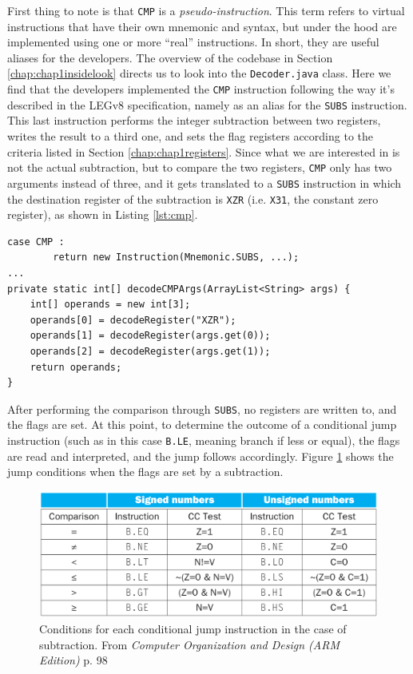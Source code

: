 First thing to note is that \verb|CMP| is a \emph{pseudo-instruction}. This term refers to virtual instructions that have their own mnemonic and syntax, but under the hood are implemented using one or more ``real'' instructions. In short, they are useful aliases for the developers. The overview of the codebase in Section \ref{chap:chap1insidelook} directs us to look into the \verb|Decoder.java| class. Here we find that the developers implemented the \verb|CMP| instruction following the way it's described in the LEGv8 specification, namely as an alias for the \verb|SUBS| instruction. 
This last instruction performs the integer subtraction between two registers, writes the result to a third one, and sets the flag registers according to the criteria listed in Section \ref{chap:chap1registers}. Since what we are interested in is not the actual subtraction, but to compare the two registers, \verb|CMP| only has two arguments instead of three, and it gets translated to a \verb|SUBS| instruction in which the destination register of the subtraction is \verb|XZR| (i.e. \verb|X31|, the constant zero register), as shown in Listing \ref{lst:cmp}. 
\begin{lstlisting}[float, caption={The CMP mnemonic being translated into a SUBS instruction}, label={lst:cmp}]
case CMP :
		return new Instruction(Mnemonic.SUBS, ...);
...
private static int[] decodeCMPArgs(ArrayList<String> args) {
	int[] operands = new int[3];
	operands[0] = decodeRegister("XZR");
	operands[1] = decodeRegister(args.get(0));
	operands[2] = decodeRegister(args.get(1));
	return operands;
}
\end{lstlisting}
After performing the comparison through \verb|SUBS|, no registers are written to, and the flags are set. At this point, to determine the outcome of a conditional jump instruction (such as in this case \verb|B.LE|, meaning branch if less or equal), the flags are read and interpreted, and the jump follows accordingly. Figure \ref{fig:condjumpflags} shows the jump conditions when the flags are set by a subtraction.
\begin{figure}
    \centering
    \includegraphics[width=1\linewidth]{img/condjumpflags.png}
    \caption{Conditions for each conditional jump instruction in the case of subtraction. From \emph{Computer Organization and Design (ARM Edition)} \cite{patterson2016computer} p. 98}
    \label{fig:condjumpflags}
\end{figure}
